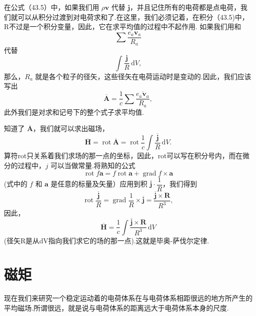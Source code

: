 在公式（43.5）中，如果我们用 $\rho\boldsymbol{v}$ 代替 $\boldsymbol{j}$，并且记住所有的电荷都是点电荷，我们就可以从积分过渡到对电荷求和了.在这里，我们必须记着，在积分（43.5)中，R不过是一个积分变量，因此，它在求平均值的过程中不起作用. 如果我们用和
\begin{equation*}
  \sum\frac{e_a\boldsymbol{v}_a}{R_a}
\end{equation*}
代替
\begin{equation*}
  \int\frac{\boldsymbol{j}}{R}\,\mathrm{d}V,
\end{equation*}
那么，$R_a$ 就是各个粒子的径矢，这些径矢在电荷运动时是变动的.因此，我们应该写出
\begin{equation}
  \overline{\boldsymbol{A}}=\frac{1}{c}\sum\frac{\overline{e_a\boldsymbol{v}_a}}{R_a},
\end{equation}
此外我们是对求和记号下的整个式子求平均值.

知道了 $\overline{\boldsymbol{A}}$，我们就可以求出磁场，
\begin{equation*}
  \overline{\boldsymbol{H}}=\operatorname{rot}\overline{\boldsymbol{A}}
  =\operatorname{rot}\frac{1}{c}\int\frac{\overline{\boldsymbol{j}}}{R}\,\mathrm{d}V.
\end{equation*}
算符rot只关系着我们求场的那一点的坐标，因此，rot可以写在积分号内，而在微分的过程中，$j$ 可以当做常量.将熟知的公式
\begin{equation*}
  \operatorname{rot}f\boldsymbol{a}
  =f\operatorname{rot}\boldsymbol{a}
  +\operatorname{grad}f\times\boldsymbol{a}
\end{equation*}
(式中的 $f$ 和 $\boldsymbol{a}$ 是任意的标量及矢量）应用到积 $\overline{\boldsymbol{j}}\cdot\dfrac{1}{R}$，我们得到
\begin{equation*}
  \operatorname{rot}\frac{\overline{\boldsymbol{j}}}{R}
  =\operatorname{grad}\frac{1}{R}\times\overline{\boldsymbol{j}}
  =\frac{\overline{\boldsymbol{j}}\times\boldsymbol{R}}{R^3},
\end{equation*}
因此，
\begin{equation}
  \overline{\boldsymbol{H}}
  =\frac{1}{c}\int\frac{\overline{\boldsymbol{j}}\times\boldsymbol{R}}{R^3}\,\mathrm{d}V
\end{equation}
(径矢R是从dV指向我们求它的场的那一点).这就是毕奥-萨伐尔定律.

\section{磁矩}

现在我们来研究一个稳定运动着的电荷体系在与电荷体系相距很远的地方所产生的平均磁场.所谓很远，就是说与电荷体系的距离远大于电荷体系本身的尺度.

